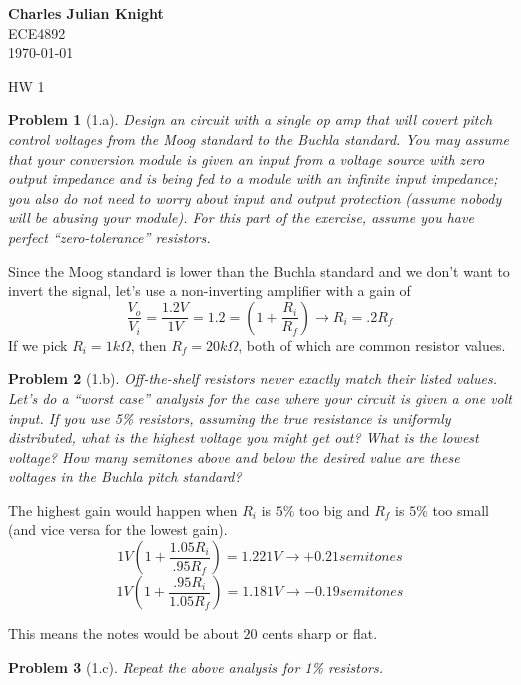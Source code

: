\documentclass[12pt]{article}
\providecommand{\ohm}[0]{\ensuremath{\Omega}}
\newtheorem*{prob}{Problem}
\begin{document}
\begin{flushright}
\textbf{Charles Julian Knight}\\
ECE4892\\
\today
\end{flushright}


\begin{center}
\huge HW 1
\end{center}

\begin{prob}[1.a]{
  Design an circuit with a single op amp that will covert pitch control voltages from the Moog standard to the Buchla standard. You may assume that your conversion module is given an input from a voltage source with zero output impedance and is being fed to a module with an infinite input impedance; you also do not need to worry about input and output protection (assume nobody will be abusing your module). For this part of the exercise, assume you have perfect ``zero-tolerance'' resistors.
}\end{prob}

Since the Moog standard is lower than the Buchla standard and we don't want to invert the signal, let's use
a non-inverting amplifier with a gain of
\[ \frac{V_o}{V_i} = \frac{1.2V}{1V} = 1.2 = \left(1+\frac{R_i}{R_f}\right) \rightarrow R_i = .2R_f \]
If we pick $R_i = 1k\ohm$, then $R_f = 20k\ohm$, both of which are common resistor values.

\begin{prob}[1.b]{
  Off-the-shelf resistors never exactly match their listed values. Let's do a ``worst case'' analysis for the case where your circuit is given a one volt input. If you use 5\% resistors, assuming the true resistance is uniformly distributed, what is the highest voltage you might get out? What is the lowest voltage? How many semitones above and below the desired value are these voltages in the Buchla pitch standard?
}\end{prob}

The highest gain would happen when $R_i$ is $5\%$ too big and $R_f$ is $5\%$ too small (and vice versa for the lowest gain). 
\[ 1V \left(1+\frac{1.05R_i}{.95R_f}\right) = 1.221V \rightarrow +0.21 semitones \]
\[ 1V \left(1+\frac{.95R_i}{1.05R_f}\right) = 1.181V \rightarrow -0.19 semitones \]

This means the notes would be about $20$ cents sharp or flat. 

\begin{prob}[1.c]{
  Repeat the above analysis for 1\% resistors.
}\end{prob}
\end{document}
